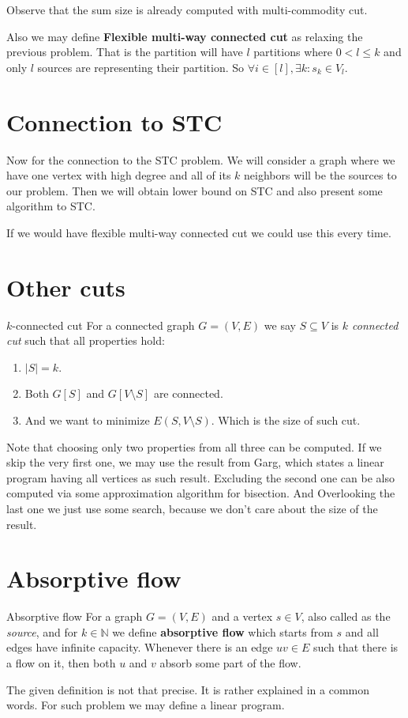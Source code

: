 \documentclass{article}
\begin{document}
	\noindent Observe that the sum size is already computed with multi-commodity cut.
	
	\noindent Also we may define \textbf{Flexible multi-way connected cut} as relaxing the previous problem. That is the partition will have $l$ partitions where $0 < l \leq k$ and only $l$ sources are representing their partition. So $\forall i \in [l] , \exists k : s_k \in V_l$.
	
	\section{Connection to STC}
	
	Now for the connection to the STC problem. We will consider a graph where we have one vertex with high degree and all of its $k$ neighbors will be the sources to our problem. Then we will obtain lower bound on STC and also present some algorithm to STC.
	
	If we would have flexible multi-way connected cut we could use this every time.
	
	\section{Other cuts}
	
	\begin{defn}{$k$-connected cut}
		For a connected graph $G = (V,E)$ we say $S \subseteq V$ is \textit{$k$ connected cut} such that all properties hold:
		
		\begin{enumerate}
			\item $|S| = k$.
			\item Both $G[S]$ and $G[V \setminus S]$ are connected.
			\item And we want to minimize $E(S, V \setminus S)$. Which is the size of such cut.
		\end{enumerate}
	\end{defn}
	
	\noindent Note that choosing only two properties from all three can be computed. If we skip the very first one, we may use the result from Garg, which states a linear program having all vertices as such result. Excluding the second one can be also computed via some approximation algorithm for bisection. And Overlooking the last one we just use some search, because we don't care about the size of the result.
	
	\section{Absorptive flow}
	
	\begin{defn}{Absorptive flow}
		For a graph $G = (V,E)$ and a vertex $s \in V$, also called as the \textit{source}, and for $k \in \mathbb{N}$ we define \textbf{absorptive flow} which starts from $s$ and all edges have infinite capacity. Whenever there is an edge $uv \in E$ such that there is a flow on it, then both $u$ and $v$ absorb some part of the flow.
	\end{defn}

	The given definition is not that precise. It is rather explained in a common words. For such problem we may define a linear program.
\end{document}

